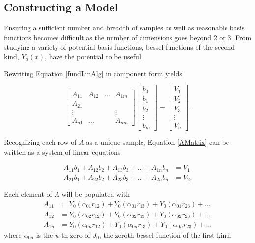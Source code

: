 \subsection{Constructing a Model}\label{Sect:LJModels}
\par Ensuring a sufficient number and breadth of samples as well as reasonable basis functions becomes difficult as the number of dimensions goes beyond 2 or 3. From studying a variety of potential basis functions, bessel functions of the second kind, $Y_\alpha(x)$, have the potential to be useful.
\par Rewriting Equation \ref{fundLinAlg} in component form yields


\begin{equation}
\begin{bmatrix}
A_{11} & A_{12} & \ldots & A_{1m} \\
A_{21} \\
\vdots & & & \vdots\\
A_{n1} & \ldots & & A_{nm}
\end{bmatrix}
\begin{bmatrix}
b_0 \\
b_1 \\
b_2 \\
\vdots \\
b_m 
\end{bmatrix}
=
\begin{bmatrix}
V_1 \\
V_2 \\
V_3 \\ 
\vdots \\
V_n
\end{bmatrix}.
\label{AMatrix}
\end{equation}

\par Recognizing each row of $A$ as a unique sample, Equation \ref{AMatrix} can be written as a system of linear equations

\begin{align}
A_{11}b_1 + A_{12}b_2 + A_{13}b_3 + ... + A_{1n}b_n &= V_1 \\
A_{21}b_1 + A_{22}b_2 + A_{23}b_3 + ... + A_{2n}b_n &= V_2.
\end{align}

\par Each element of $A$ will be populated with
\begin{align}
A_{11} &= Y_0(\alpha_{01} r_{12}) + Y_0(\alpha_{01} r_{13}) + Y_0(\alpha_{01} r_{23}) + \ldots \\
A_{12} &= Y_0(\alpha_{02} r_{12}) + Y_0(\alpha_{02} r_{13}) + Y_0(\alpha_{02} r_{23}) + \ldots  \\
A_{1n} &= Y_0(\alpha_{0n} r_{12}) + Y_0(\alpha_{0n} r_{13}) + Y_0(\alpha_{0n} r_{23}) + \ldots
\end{align}
where $\alpha_{0n}$ is the $n$-th zero of $J_0$, the zeroth bessel function of the first kind.

